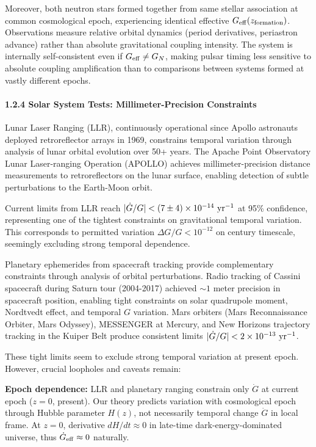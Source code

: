 \documentclass[11pt,a4paper]{article}
\begin{document}
Moreover, both neutron stars formed together from same stellar
association at common cosmological epoch, experiencing identical
effective \(G_{\rm eff}(z_{\rm formation})\). Observations measure
relative orbital dynamics (period derivatives, periastron advance)
rather than absolute gravitational coupling intensity. The system is
internally self-consistent even if \(G_{\rm eff} \neq G_N\), making
pulsar timing less sensitive to absolute coupling amplification than to
comparisons between systems formed at vastly different epochs.

\hypertarget{solar-system-tests-millimeter-precision-constraints}{%
\paragraph{1.2.4 Solar System Tests: Millimeter-Precision
Constraints}\label{solar-system-tests-millimeter-precision-constraints}}

Lunar Laser Ranging (LLR), continuously operational since Apollo
astronauts deployed retroreflector arrays in 1969, constrains temporal
variation through analysis of lunar orbital evolution over 50+ years.
The Apache Point Observatory Lunar Laser-ranging Operation (APOLLO)
achieves millimeter-precision distance measurements to retroreflectors
on the lunar surface, enabling detection of subtle perturbations to the
Earth-Moon orbit.

Current limits from LLR reach
\(|\dot{G}/G| < (7 \pm 4) \times 10^{-14}~{\rm yr^{-1}}\) at 95\%
confidence, representing one of the tightest constraints on
gravitational temporal variation. This corresponds to permitted
variation \(\Delta G/G < 10^{-12}\) on century timescale, seemingly
excluding strong temporal dependence.

Planetary ephemerides from spacecraft tracking provide complementary
constraints through analysis of orbital perturbations. Radio tracking of
Cassini spacecraft during Saturn tour (2004-2017) achieved \(\sim 1\)
meter precision in spacecraft position, enabling tight constraints on
solar quadrupole moment, Nordtvedt effect, and temporal \(G\) variation.
Mars orbiters (Mars Reconnaissance Orbiter, Mars Odyssey), MESSENGER at
Mercury, and New Horizons trajectory tracking in the Kuiper Belt produce
consistent limits \(|\dot{G}/G| < 2 \times 10^{-13}~{\rm yr^{-1}}\).

These tight limits seem to exclude strong temporal variation at present
epoch. However, crucial loopholes and caveats remain:

\textbf{Epoch dependence:} LLR and planetary ranging constrain only
\(\dot{G}\) at current epoch (\(z = 0\), present). Our theory predicts
variation with cosmological epoch through Hubble parameter \(H(z)\), not
necessarily temporal change \(\dot{G}\) in local frame. At \(z = 0\),
derivative \(dH/dt \approx 0\) in late-time dark-energy-dominated
universe, thus \(\dot{G}_{\rm eff} \approx 0\) naturally.
\end{document}
